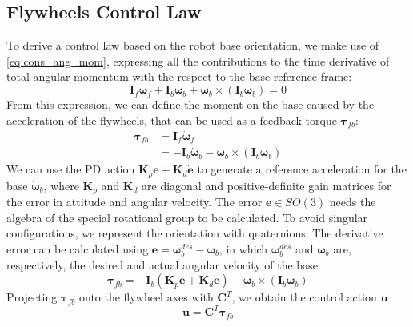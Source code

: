 \documentclass[letterpaper, 10 pt, conference]{ieeeconf}  %
\begin{document}
\subsection{Flywheels Control Law}
\label{subsec:control_law}
To derive a control law based on the robot base orientation, we make use of \eqref{eq:cons_ang_mom}, expressing all the contributions to the time derivative of total angular momentum with the respect to the base reference frame:
\begin{equation*}
\bm{I}_f \dot{\bm{\omega}}_f + \bm{I}_b \dot{\bm{\omega}}_b + \bm{\omega}_b \times \left( \bm{I}_b \bm{\omega}_b\right) = 0
\end{equation*}
From this expression, we can define the moment on the base caused by the acceleration of the flywheels, that can be used as a feedback torque $\bm{\tau}_{fb}$:
\begin{equation*}
\begin{split}
\bm{\tau}_{fb} &= \bm{I}_f \dot{\bm{\omega}}_f \\
&= - \bm{I}_b \dot{\bm{\omega}}_b - \bm{\omega}_b \times \left( \bm{I}_b \bm{\omega}_b\right)
\end{split}
\end{equation*}
We can use the PD action $\bm{K}_p \bm{e} + \bm{K}_d \dot{\bm{e}}$ to generate a reference acceleration for the base $\dot{\bm{\omega}}_b$, where $\bm{K}_p$ and $\bm{K}_d$ are diagonal and positive-definite gain matrices for the error in attitude and angular velocity.
The error $\bm{e} \in SO(3)$ needs the algebra of the special rotational group to be calculated. To avoid singular configurations, we represent the orientation with quaternions.
The derivative error can be calculated using $\dot{\bm{e}} = \bm{\omega}^{des}_b - \bm{\omega}_b$, in which $\bm{\omega}^{des}_b$ and $\bm{\omega}_b$ are, respectively, the desired and actual angular velocity of the base:
\begin{equation*}
\bm{\tau}_{fb} = - \bm{I}_b \left(\bm{K}_p \bm{e} + \bm{K}_d \dot{\bm{e}}\right) - \bm{\omega}_b \times \left( \bm{I}_b \bm{\omega}_b\right)
\end{equation*}
Projecting $\bm{\tau}_{fb}$ onto the flywheel axes with $\bm{C}^T$, we obtain the control action $\bm{u}$
\begin{equation}
\label{eq:ctrl_law}
\bm{u} = \bm{C}^T \bm{\tau}_{fb}
\end{equation}
\end{document}
